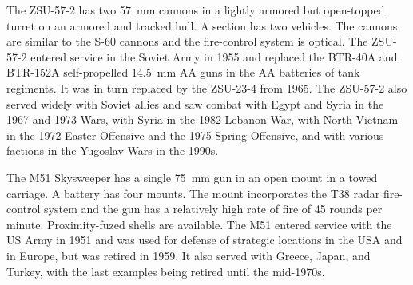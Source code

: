 \begin{withcounters}

    The ZSU-57-2 has two 57~mm cannons in a lightly armored but open-topped turret on an armored and tracked hull.
    A section has two vehicles.
    The cannons are similar to the S-60 cannons and the fire-control system is optical.
    The ZSU-57-2 entered service in the Soviet Army in 1955 and replaced the BTR-40A and BTR-152A self-propelled 14.5~mm AA guns in the AA batteries of tank regiments. It was in turn replaced by the ZSU-23-4 from 1965. The ZSU-57-2 also served widely with Soviet allies and saw combat with Egypt and Syria in the 1967 and 1973 Wars, with Syria in the 1982 Lebanon War, with North Vietnam in the 1972 Easter Offensive and the 1975 Spring Offensive, and with various factions in the Yugoslav Wars in the 1990s.%


    The M51 Skysweeper has a single 75~mm gun in an open mount in a towed carriage.
    A battery has four mounts.
    The mount incorporates the T38 radar fire-control system and the gun has a relatively high rate of fire of 45 rounds per minute.
    Proximity-fuzed shells are available.
    The M51 entered service with the US Army in 1951 and was used for defense of strategic locations in the USA and in Europe, but was retired in 1959. It also served with Greece, Japan, and Turkey, with the last examples being retired until the mid-1970s.
\end{withcounters}
